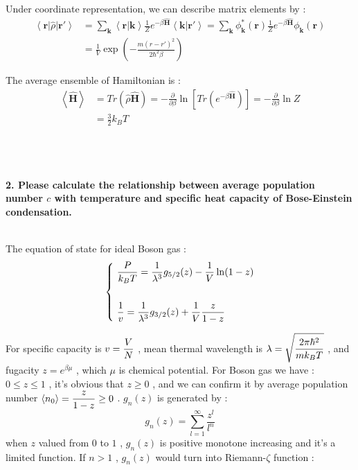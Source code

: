 \documentclass[12pt]{article}
\numberwithin{equation}{section}	 %
\begin{document}
\begin{spacing}{1.5}
\begin{proof*}
Under coordinate representation, we can describe matrix elements by :
\begin{align}\nonumber 		%
\left<\bm r\right| \hat\rho \left|\bm{r'}\right> &= \sum_{\bm k}\left<\bm{r}|\bm k\right> \frac{1}{Z}e^{-\beta\bm{\hat H}} \left<\bm k|\bm{r'}\right> = \sum_{\bm k} \phi^{*}_{\bm k}(\bm{r}) \frac{1}{Z}e^{-\beta\bm{\hat H}} \phi_{\bm k}(\bm{r}) \\
&= \frac{1}{V}\exp\left(-\frac{m(r-r')^{2}}{2\hbar^{2}\beta}\right)
\end{align}

The average ensemble of Hamiltonian is :
\begin{align}\nonumber 		%
\left<\bm{\hat H}\right> &= Tr(\hat\rho \bm{\hat H}) = -\frac{\partial}{\partial\beta} \ln\left[ Tr(e^{-\beta\bm{\hat H}})\right] = -\frac{\partial}{\partial\beta}\ln Z\\
&= \frac{3}{2}k_{B}T
\end{align}

\end{proof*}
~\\
~\\
~\\


\textbf{2. Please calculate the relationship between average population number $c$ with temperature and specific heat capacity of Bose-Einstein condensation.} \\		%
~\\
\begin{proof*}
The equation of state for ideal Boson gas :
\begin{equation}
\label{BosonGas}
\left\{		%
\begin{aligned}
\dps
&\frac{P}{k_{B}T} =\frac{1}{\lambda^{3}}g_{5/2}(z) - \frac{1}{V}\ln(1-z)\\
~\\
&\frac{1}{v} =\frac{1}{\lambda^{3}}g_{3/2}(z) + \frac{1}{V}\frac{z}{1-z}
\end{aligned}
\right.	%
\end{equation}

For specific capacity is $\displaystyle v = \frac{V}{N}$ , mean thermal wavelength is $\displaystyle \lambda = \sqrt{\frac{2\pi\hbar^{2}}{mk_{B}T}}$ , and fugacity $z = e^{\beta\mu}$ , which $\mu$ is chemical potential. For Boson gas we have : $0 \le z \le 1$ , it's obvious that $z \ge 0$ , and we can confirm it by average population number $\displaystyle \left<n_{0}\right> = \frac{z}{1-z} \ge 0$ . $g_{n}(z)$ is generated by :
\begin{equation}
g_{n}(z) = \sum^{\infty}_{l=1}\frac{z^{l}}{l^{n}}
\end{equation}
when $z$ valued from $0$ to $1$ , $g_{n}(z)$ is positive monotone increasing and it's a limited function. If $n > 1$ , $g_{n}(z)$ would turn into Riemann-$\zeta$ function :


\end{proof*}
\end{spacing}
\end{document}
